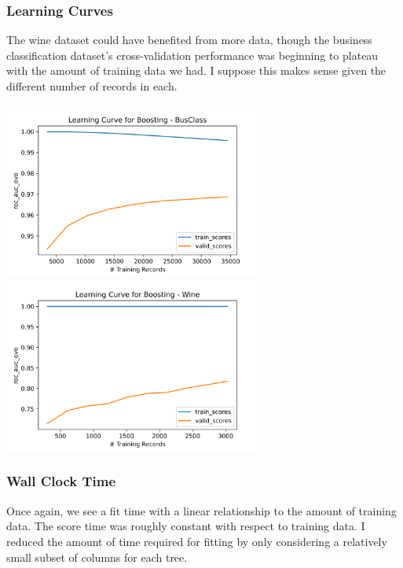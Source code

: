 \documentclass[
	letterpaper, %
]{jdf}
\begin{document}
\subsubsection{Learning Curves}
The wine dataset could have benefited from more data, though the business classification dataset's cross-validation performance was beginning to plateau with the amount of training data we had. I suppose this makes sense given the different number of records in each.

\includegraphics[width=3.4in]{Figures/BusClass-0920/GBM/learn_curve.png}
\includegraphics[width=3.4in]{Figures/Wine-0921/GBM/learn_curve.png}

\subsubsection{Wall Clock Time}

Once again, we see a fit time with a linear relationship to the amount of training data. The score time was roughly constant with respect to training data. I reduced the amount of time required for fitting by only considering a relatively small subset of columns for each tree.
\end{document}

